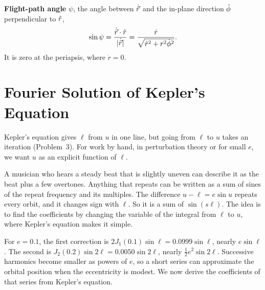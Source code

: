 	\textbf{Flight-path angle} $\psi$, the angle between $\dot{\vec r}$ and the in-plane direction $\hat\phi$ perpendicular to $\hat r$,
	\begin{equation}
		\sin\psi = \frac{\dot{\vec r}\cdot\hat r}{|\dot{\vec r}|}=\frac{\dot r}{\sqrt{\dot r^2+r^2\dot\phi^2}}. \label{eq:flightpath}
	\end{equation}
	It is zero at the periapsis, where $\dot r=0$.

	\section{Fourier Solution of Kepler's Equation}
	\label{sec:bessel}

	Kepler's equation gives $\ell$ from $u$ in one line, but going from $\ell$ to $u$ takes an iteration (Problem~3). 	For work by hand, in perturbation theory or for small $e$, we want $u$ as an explicit function of $\ell$.

	A musician who hears a steady beat that is slightly uneven can describe it as the beat plus a few overtones. Anything that repeats can be written as a sum of sines of the repeat frequency and its multiples. 	The difference $u-\ell=e\sin u$ repeats every orbit, and it changes sign with $\ell$. So it is a sum of $\sin(s\ell)$. The idea is to find the coefficients by changing the variable of the integral from $\ell$ to $u$, where Kepler's equation makes it simple.

	For $e=0.1$, the first correction is $2J_1(0.1)\sin\ell=0.0999\sin\ell$, nearly $e\sin\ell$. The second is $J_2(0.2)\sin2\ell=0.0050\sin2\ell$, nearly $\tfrac12e^2\sin2\ell$. Successive harmonics become smaller as powers of $e$, so a short series can approximate the orbital position when the eccentricity is modest. We now derive the coefficients of that series from Kepler's equation.

